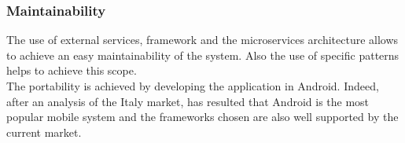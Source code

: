 \subsubsection{Maintainability}
The use of external services, framework and the microservices architecture allows to achieve an easy maintainability of the system. 
Also the use of specific patterns helps to achieve this scope.\\
The portability is achieved by developing the application in Android. 
Indeed, after an analysis of the Italy market, has resulted that Android is the most popular mobile system and the frameworks chosen are also
well supported by the current market.

